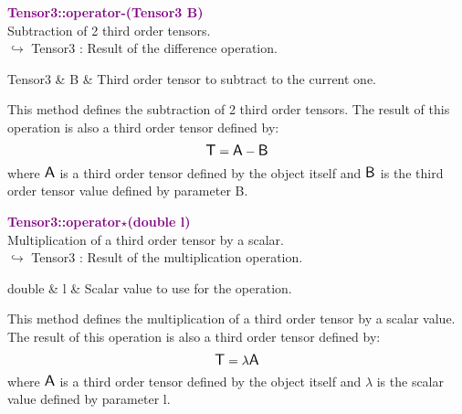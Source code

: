 \textcolor{purple}{\textbf{Tensor3::operator-(Tensor3 B)}}\label{Tensor3::operator-(Tensor3 B)}\\
Subtraction of 2 third order tensors.\\ \hspace*{10mm}$\hookrightarrow$ Tensor3 : Result of the difference operation.

\begin{tcolorbox}[width=\textwidth,myArgs,tabularx={ll|R}]
Tensor3 & B & Third order tensor to subtract to the current one.
\end{tcolorbox}

This method defines the subtraction of 2 third order tensors.
The result of this operation is also a third order tensor defined by:
\begin{equation*}
\mbox{\large\ensuremath{\mathsf{T}}} = \mbox{\large\ensuremath{\mathsf{A}}} - \mbox{\large\ensuremath{\mathsf{B}}}
\end{equation*}
where $\mbox{\large\ensuremath{\mathsf{A}}}$ is a third order tensor defined by the object itself and $\mbox{\large\ensuremath{\mathsf{B}}}$ is the third order tensor value defined by parameter B.

\textcolor{purple}{\textbf{Tensor3::operator$\star$(double l)}}\label{Tensor3::operator*(double l)}\\
Multiplication of a third order tensor by a scalar.\\ \hspace*{10mm}$\hookrightarrow$ Tensor3 : Result of the multiplication operation.

\begin{tcolorbox}[width=\textwidth,myArgs,tabularx={ll|R}]
double & l & Scalar value to use for the operation.
\end{tcolorbox}

This method defines the multiplication of a third order tensor by a scalar value.
The result of this operation is also a third order tensor defined by:
\begin{equation*}
\mbox{\large\ensuremath{\mathsf{T}}} = \lambda \mbox{\large\ensuremath{\mathsf{A}}}
\end{equation*}
where $\mbox{\large\ensuremath{\mathsf{A}}}$ is a third order tensor defined by the object itself and $\lambda$ is the scalar value defined by parameter l.

